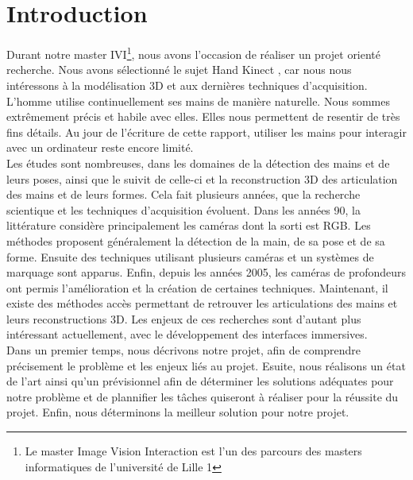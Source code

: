 \chapter*{Introduction}

Durant notre master IVI\footnote{Le master Image Vision Interaction est 
l'un des parcours des masters informatiques de l'université de Lille 1}, 
nous avons l'occasion de réaliser un projet orienté recherche. Nous avons 
sélectionné le sujet \og Hand Kinect \fg, car nous nous intéressons à la 
modélisation 3D et aux dernières techniques d'acquisition. \\

L'homme utilise continuellement ses mains de manière naturelle. Nous 
sommes extrêmement précis et habile avec elles. Elles nous permettent 
de resentir de très fins détails. Au jour de l'écriture de cette rapport,
utiliser les mains pour interagir avec un ordinateur reste encore limité.\\

Les études sont nombreuses, dans les domaines de la détection des mains 
et de leurs poses, ainsi que le suivit de celle-ci et la reconstruction 
3D des articulation des mains et de leurs formes. Cela fait plusieurs années, 
que la recherche scientique et les techniques d'acquisition évoluent. 
Dans les années 90, la littérature considère principalement les caméras 
dont la sorti est RGB. Les méthodes proposent généralement la détection 
de la main, de sa pose et de sa forme. Ensuite des techniques utilisant 
plusieurs caméras et un systèmes de marquage sont apparus. Enfin, depuis 
les années 2005, les caméras de profondeurs ont permis l'amélioration 
et la création de certaines techniques. Maintenant, il existe des méthodes 
accès permettant de retrouver les articulations des mains et leurs 
reconstructions 3D. Les enjeux de ces recherches sont d'autant plus 
intéressant actuellement, avec le développement des interfaces 
immersives.\\


Dans un premier temps, nous décrivons notre projet, afin de comprendre 
précisement le problème et les enjeux liés au projet. Esuite, nous réalisons 
un état de l'art ainsi qu'un prévisionnel afin de déterminer les solutions 
adéquates pour notre problème et de plannifier les tâches quiseront à 
réaliser pour la réussite du projet. Enfin, nous déterminons la meilleur 
solution pour notre projet.



